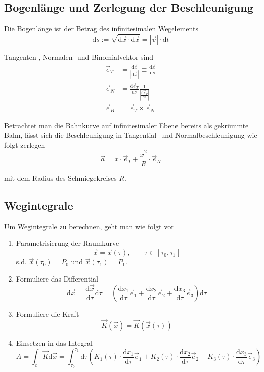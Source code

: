 \documentclass{article}
\newcommand{\diff}{\mathrm{d}}
\newcommand{\lr}[1]{\left(#1\right)}
\begin{document}
\subsection{Bogenlänge und Zerlegung der Beschleunigung}
Die Bogenlänge ist der Betrag des infinitesimalen Wegelements
	\begin{equation}
		\diff s := \sqrt{\diff\vec{x} \cdot \diff\vec{x}} = |\vec{v}| \cdot \diff t
	\end{equation}

Tangenten-, Normalen- und Binomialvektor sind
	\begin{align*}
		\vec{e}_T &= \frac{\diff\vec{x}}{|\diff\vec{x}|} \equiv \frac{\diff\vec{x}}{\diff s} \\
		\vec{e}_N &= \frac{\diff \vec{e}_T}{\diff s} \frac{1}{|\frac{\diff \vec{e}_T}{\diff s}|} \\
		\vec{e}_B &= \vec{e}_T \times \vec{e}_N
	\end{align*}

Betrachtet man die Bahnkurve auf infinitesimaler Ebene bereits als gekrümmte Bahn, lässt sich die Beschleunigung in Tangential- und Normalbeschleunigung wie folgt zerlegen
	\begin{equation}
		\ddot{\vec{a}} = \dot{x} \cdot \vec{e}_T + \frac{\dot{x}^2}{R} \cdot \vec{e}_N
	\end{equation}
	
mit dem Radius des Schmiegekreises $R$.


\newpage


\subsection{Wegintegrale}
Um Wegintegrale zu berechnen, geht man wie folgt vor
\begin{enumerate}
	\item Parametrisierung der Raumkurve
		$$\vec{x} = \vec{x}(\tau),\qquad \tau\in [\tau_0,\tau_1]$$
	s.d. $\vec{x}(\tau_0) = P_0$ und $\vec{x}(\tau_1) = P_1$.
	
	\item Formuliere das Differential
		$$\diff\vec{x} = \frac{\diff \vec{x}}{\diff \tau} \diff\tau = \lr{ \frac{\diff x_1}{\diff \tau}\vec{e}_1 + \frac{\diff x_2}{\diff \tau}\vec{e}_2 + \frac{\diff x_3}{\diff \tau}\vec{e}_3 } \diff\tau$$
		
	\item Formuliere die Kraft
		$$\vec{K}(\vec{x}) = \vec{K}(\vec{x}(\tau))$$
	
	\item Einsetzen in das Integral
		$$A = \int_c \vec{K} \diff\vec{x} = \int_{\tau_0}^{\tau_1} \diff\tau \lr{ K_1(\tau)\cdot \frac{\diff x_1}{\diff \tau}\vec{e}_1 + K_2(\tau)\cdot \frac{\diff x_2}{\diff \tau}\vec{e}_2 + K_3(\tau)\cdot \frac{\diff x_3}{\diff \tau}\vec{e}_3 }$$
\end{enumerate}
\end{document}
